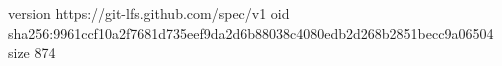 version https://git-lfs.github.com/spec/v1
oid sha256:9961ccf10a2f7681d735eef9da2d6b88038c4080edb2d268b2851becc9a06504
size 874
